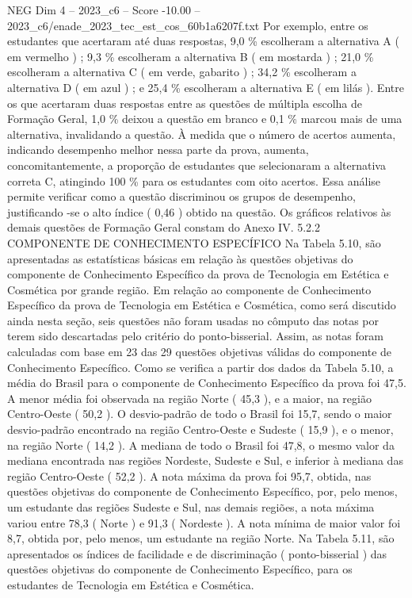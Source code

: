 \begin{textsample}{NEG Dim 4 – 2023\_c6 – Score -10.00 – 2023\_c6/enade\_2023\_tec\_est\_cos\_60b1a6207f.txt}
Por exemplo, entre os estudantes que acertaram até duas respostas, 9,0 \% escolheram a alternativa A ( em vermelho ) ; 9,3 \% escolheram a alternativa B ( em mostarda ) ; 21,0 \% escolheram a alternativa C ( em verde, gabarito ) ; 34,2 \% escolheram a alternativa D ( em azul ) ; e 25,4 \% escolheram a alternativa E ( em lilás ).
Entre os que acertaram duas respostas entre as questões de múltipla escolha de Formação Geral, 1,0 \% deixou a questão em branco e 0,1 \% marcou mais de uma alternativa, invalidando a questão.
À medida que o número de acertos aumenta, indicando desempenho melhor nessa parte da prova, aumenta, concomitantemente, a proporção de estudantes que selecionaram a alternativa correta C, atingindo 100 \% para os estudantes com oito acertos.
Essa análise permite verificar como a questão discriminou os grupos de desempenho, justificando -se o alto índice ( 0,46 ) obtido na questão.
Os gráficos relativos às demais questões de Formação Geral constam do Anexo IV. 5.2.2 COMPONENTE DE CONHECIMENTO ESPECÍFICO Na Tabela 5.10, são apresentadas as estatísticas básicas em relação às questões objetivas do componente de Conhecimento Específico da prova de Tecnologia em Estética e Cosmética por grande região.
Em relação ao componente de Conhecimento Específico da prova de Tecnologia em Estética e Cosmética, como será discutido ainda nesta seção, seis questões não foram usadas no cômputo das notas por terem sido descartadas pelo critério do ponto-bisserial.
Assim, as notas foram calculadas com base em 23 das 29 questões objetivas válidas do componente de Conhecimento Específico.
Como se verifica a partir dos dados da Tabela 5.10, a média do Brasil para o componente de Conhecimento Específico da prova foi 47,5.
A menor média foi observada na região Norte ( 45,3 ), e a maior, na região Centro-Oeste ( 50,2 ).
O desvio-padrão de todo o Brasil foi 15,7, sendo o maior desvio-padrão encontrado na região Centro-Oeste e Sudeste ( 15,9 ), e o menor, na região Norte ( 14,2 ).
A mediana de todo o Brasil foi 47,8, o mesmo valor da mediana encontrada nas regiões Nordeste, Sudeste e Sul, e inferior à mediana das região Centro-Oeste ( 52,2 ).
A nota máxima da prova foi 95,7, obtida, nas questões objetivas do componente de Conhecimento Específico, por, pelo menos, um estudante das regiões Sudeste e Sul, nas demais regiões, a nota máxima variou entre 78,3 ( Norte ) e 91,3 ( Nordeste ).
A nota mínima de maior valor foi 8,7, obtida por, pelo menos, um estudante na região Norte.
Na Tabela 5.11, são apresentados os índices de facilidade e de discriminação ( ponto-bisserial ) das questões objetivas do componente de Conhecimento Específico, para os estudantes de Tecnologia em Estética e Cosmética.

\end{textsample}
